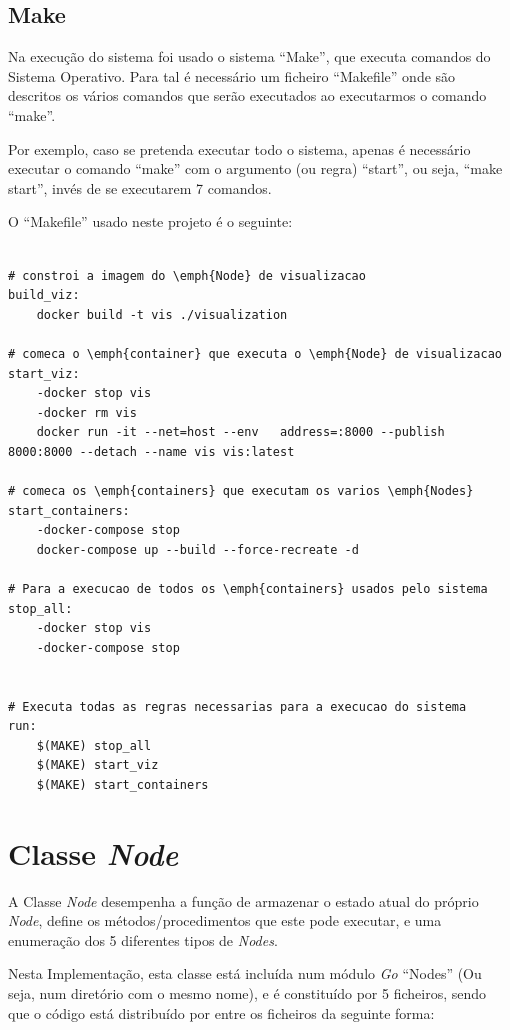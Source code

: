 \subsection*{Make}

Na execução do sistema foi usado o sistema ``Make'', que executa comandos do Sistema Operativo. Para tal é necessário um ficheiro ``Makefile'' onde são descritos os vários comandos que serão executados ao executarmos o comando ``make''.

Por exemplo, caso se pretenda executar todo o sistema, apenas é necessário executar o comando ``make'' com o argumento (ou regra) ``start'', ou seja, ``make start'', invés de se executarem 7 comandos.


O ``Makefile'' usado neste projeto é o seguinte:

\begin{lstlisting}[caption={Ficheiro ``Makefile''}]

# constroi a imagem do \emph{Node} de visualizacao
build_viz:
	docker build -t vis ./visualization

# comeca o \emph{container} que executa o \emph{Node} de visualizacao
start_viz:
	-docker stop vis
	-docker rm vis
	docker run -it --net=host --env   address=:8000 --publish 8000:8000 --detach --name vis vis:latest

# comeca os \emph{containers} que executam os varios \emph{Nodes}
start_containers:
	-docker-compose stop
	docker-compose up --build --force-recreate -d

# Para a execucao de todos os \emph{containers} usados pelo sistema
stop_all:
	-docker stop vis
	-docker-compose stop


# Executa todas as regras necessarias para a execucao do sistema
run:
	$(MAKE) stop_all
	$(MAKE) start_viz
	$(MAKE) start_containers
\end{lstlisting}


\section{Classe \emph{Node}}
\label{implementacao:sec:classe_node}
A Classe \emph{Node} desempenha a função de armazenar o estado atual do próprio \emph{Node}, define os métodos/procedimentos que este pode executar, e uma enumeração dos 5 diferentes tipos de \emph{Nodes}.



Nesta Implementação, esta classe está incluída num módulo \emph{Go} ``Nodes'' (Ou seja, num diretório com o mesmo nome), e é constituído por 5 ficheiros, sendo que o código está distribuído por entre os ficheiros da seguinte forma:

